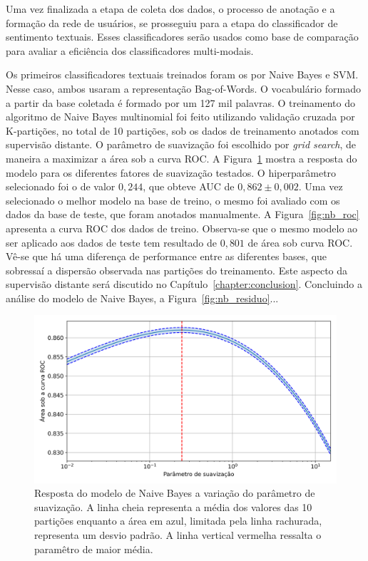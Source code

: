 Uma vez finalizada a etapa de coleta dos dados, o processo de anotação e a
formação da rede de usuários, se prosseguiu para a etapa do classificador de
sentimento textuais.
Esses classificadores serão usados como base de comparação para avaliar a
eficiência dos classificadores multi-modais.

Os primeiros classificadores textuais treinados foram os por Naive Bayes e SVM.
Nesse caso, ambos usaram a representação Bag-of-Words.
O vocabulário formado a partir da base coletada é formado por um 127 mil
palavras.
O treinamento do algoritmo de Naive Bayes multinomial foi feito utilizando
validação cruzada por K-partições, no total de 10 partições, sob os dados de
treinamento anotados com supervisão distante. O parâmetro de suavização foi
escolhido por \textit{grid search}, de maneira a maximizar a área sob a curva ROC.
A Figura~\ref{fig:nb_grid} mostra a resposta do modelo para os diferentes fatores
de suavização testados.
O hiperparâmetro selecionado foi o de valor $0,244$, que obteve AUC de $0,862 \pm 0,002$.
Uma vez selecionado o melhor modelo na base de treino, o mesmo foi avaliado com
os dados da base de teste, que foram anotados manualmente.
A Figura~\ref{fig:nb_roc} apresenta a curva ROC dos dados de treino.
Observa-se que o mesmo modelo ao ser aplicado aos dados de teste tem resultado
de $0,801$ de área sob curva ROC.
Vê-se que há uma diferença de performance entre as diferentes bases, que
sobressaí a dispersão observada nas partições do treinamento.
Este aspecto da supervisão distante será discutido no Capítulo~\ref{chapter:conclusion}.
Concluindo a análise do modelo de Naive Bayes, a Figura~\ref{fig:nb_residuo}...

\begin{figure}[h]
\begin{center} {
    \begin{center}
    \includegraphics[scale=0.65]{images/nb_grid.png}
    \caption{Resposta do modelo de Naive Bayes a variação do parâmetro de suavização.
             A linha cheia representa a média dos valores das 10 partições
             enquanto a área em azul, limitada pela linha rachurada, representa um desvio padrão.
             A linha vertical vermelha ressalta o paramêtro de maior média.}
    \label{fig:nb_grid}
    \end{center}
}
\end{center}
\end{figure}


